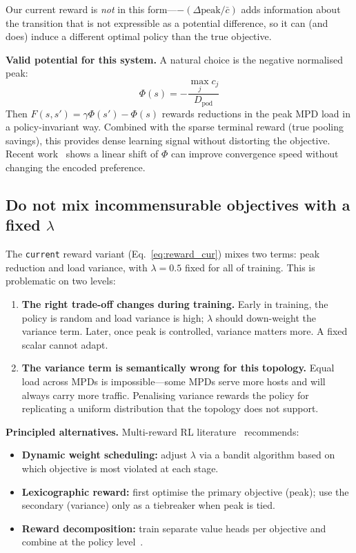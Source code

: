 \documentclass[11pt]{article}
\begin{document}
\noindent Our current reward is \emph{not} in this form---$-({\Delta\text{peak}}/{\bar c})$
adds information about the transition that is not expressible as a potential difference,
so it can (and does) induce a different optimal policy than the true objective.

\noindent\textbf{Valid potential for this system.}
A natural choice is the negative normalised peak:
\begin{equation}
  \Phi(s) = -\frac{\max_j c_j}{D_{\text{pod}}}
\end{equation}
Then $F(s,s') = \gamma\Phi(s') - \Phi(s)$ rewards reductions in the peak MPD
load in a policy-invariant way.
Combined with the sparse terminal reward (true pooling savings), this provides
dense learning signal without distorting the objective.
Recent work~\cite{pbrs2025} shows a linear shift of $\Phi$ can improve convergence
speed without changing the encoded preference.

\subsection{Do not mix incommensurable objectives with a fixed $\lambda$}

The \texttt{current} reward variant (Eq.~\ref{eq:reward_cur}) mixes two terms:
peak reduction and load variance, with $\lambda = 0.5$ fixed for all of training.
This is problematic on two levels:

\begin{enumerate}
  \item \textbf{The right trade-off changes during training.}
        Early in training, the policy is random and load variance is high; $\lambda$
        should down-weight the variance term.  Later, once peak is controlled,
        variance matters more.  A fixed scalar cannot adapt.

  \item \textbf{The variance term is semantically wrong for this topology.}
        Equal load across MPDs is impossible---some MPDs serve more hosts and will
        always carry more traffic.  Penalising variance rewards the policy for
        replicating a uniform distribution that the topology does not support.
\end{enumerate}

\noindent\textbf{Principled alternatives.}
Multi-reward RL literature~\cite{multireward2024} recommends:
\begin{itemize}
  \item \textbf{Dynamic weight scheduling:} adjust $\lambda$ via a bandit
        algorithm based on which objective is most violated at each stage.
  \item \textbf{Lexicographic reward:} first optimise the primary objective
        (peak); use the secondary (variance) only as a tiebreaker when peak
        is tied.
  \item \textbf{Reward decomposition:} train separate value heads per objective
        and combine at the policy level~\cite{rewardsurvey2025}.
\end{itemize}
\end{document}
